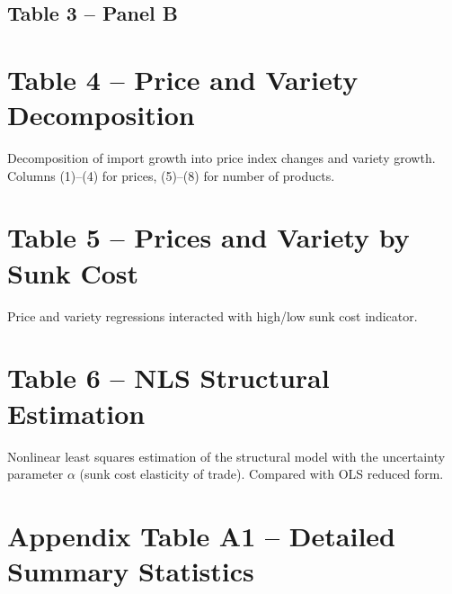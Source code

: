 \documentclass[12pt]{article}
\begin{document}


\subsection*{Table 3 -- Panel B}



\clearpage
\section{Table 4 -- Price and Variety Decomposition}

Decomposition of import growth into price index changes and variety growth.
Columns (1)--(4) for prices, (5)--(8) for number of products.



\clearpage
\section{Table 5 -- Prices and Variety by Sunk Cost}

Price and variety regressions interacted with high/low sunk cost indicator.



\clearpage
\section{Table 6 -- NLS Structural Estimation}

Nonlinear least squares estimation of the structural model with the uncertainty
parameter $\alpha$ (sunk cost elasticity of trade). Compared with OLS reduced form.



\clearpage
\section{Appendix Table A1 -- Detailed Summary Statistics}



\clearpage
\end{document}
